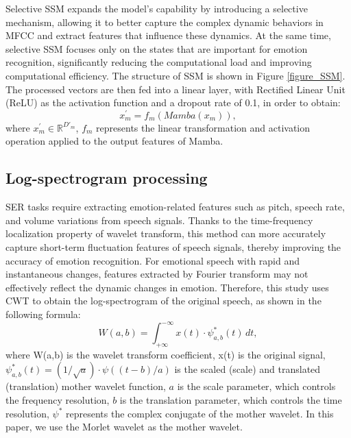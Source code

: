 \documentclass[runningheads]{llncs}
\begin{document}
Selective SSM expands the model's capability by introducing a selective mechanism, allowing it to better capture the complex dynamic behaviors in MFCC and extract features that influence these dynamics. At the same time, selective SSM focuses only on the states that are important for emotion recognition, significantly reducing the computational load and improving computational efficiency. The structure of SSM is shown in Figure \ref{figure_SSM}. The processed vectors are then fed into a linear layer, with Rectified Linear Unit (ReLU) as the activation function and a dropout rate of 0.1, in order to obtain:
\begin{equation}
x^{'}_{m}=f_{m}(Mamba(x_m)),
\end{equation}
where \(x^{'}_{m}\in \mathbb{R}^{D'_m}\), \(f_{m}\) represents the linear transformation and activation operation applied to the output features of Mamba.

\subsection{Log-spectrogram processing}

SER tasks require extracting emotion-related features such as pitch, speech rate, and volume variations from speech signals. Thanks to the time-frequency localization property of wavelet transform, this method can more accurately capture short-term fluctuation features of speech signals, thereby improving the accuracy of emotion recognition. For emotional speech with rapid and instantaneous changes, features extracted by Fourier transform may not effectively reflect the dynamic changes in emotion. Therefore, this study uses CWT to obtain the log-spectrogram of the original speech, as shown in the following formula:
\begin{equation}
W(a,b)=\int_{+\infty}^{-\infty}x(t)\cdot \psi_{a,b}^*(t) \, dt, 
\end{equation}
where W(a,b) is the wavelet transform coefficient, x(t) is the original signal, $\psi_{a,b}^*(t) = (1/\sqrt a) \cdot \psi((t - b)/a)$ is the scaled (scale) and translated (translation) mother wavelet function, $a$ is the scale parameter, which controls the frequency resolution, $b$ is the translation parameter, which controls the time resolution,  \(\psi^*\) represents the complex conjugate of the mother wavelet. In this paper, we use the Morlet wavelet as the mother wavelet. 
\end{document}
